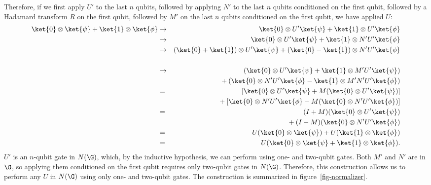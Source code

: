 Therefore, if we first apply $U'$ to the last $n$ qubits, followed by applying
$N'$ to the last $n$ qubits conditioned on the first qubit, followed by a
Hadamard transform $R$ on the first qubit, followed by $M'$ on the last $n$
qubits conditioned on the first qubit, we have applied $U$:
\begin{eqnarray}
	\ket{0} \otimes \ket{\psi} + \ket{1} \otimes \ket{\phi}
	& \rightarrow & \ket{0} \otimes U' \ket{\psi} + \ket{1} \otimes U'
	\ket{\phi} \\
	& \rightarrow & \ket{0} \otimes U' \ket{\psi} + \ket{1} \otimes N' U'
	\ket{\phi} \\
	& \rightarrow & (\ket{0} + \ket{1}) \otimes U' \ket{\psi} + (\ket{0} -
	\ket{1}) \otimes N' U' \ket{\phi} \nonumber \\ \\
	& \rightarrow & (\ket{0} \otimes U' \ket{\psi} + \ket{1} \otimes M' U'
	\ket{\psi}) \nonumber \\
	& & \mbox{} + (\ket{0} \otimes N' U' \ket{\phi} - \ket{1} \otimes M' N' U'
	\ket{\phi}) \\
	& = & \left[ \ket{0} \otimes U' \ket{\psi} + M (\ket{0} \otimes U'
	\ket{\psi}) \right] \nonumber \\
	& & \mbox{} + \left[ \ket{0} \otimes N' U' \ket{\phi} - M (\ket{0}
	\otimes N' U' \ket{\phi}) \right] \\
	& = & (I + M) (\ket{0} \otimes U' \ket{\psi}) \nonumber \\
	& & \mbox{} + (I - M) (\ket{0} \otimes N' U' \ket{\phi}) \\
	& = & U (\ket{0} \otimes \ket{\psi}) + U (\ket{1} \otimes \ket{\phi}) \\
	& = & U (\ket{0} \otimes \ket{\psi} + \ket{1} \otimes \ket{\phi}).
\end{eqnarray}
$U'$ is an $n$-qubit gate in $N(\G)$, which, by the inductive hypothesis, we
can perform using one- and two-qubit gates.  Both $M'$ and $N'$ are in $\G$, so
applying them conditioned on the first qubit requires only two-qubit gates
in $N(\G)$.  Therefore, this construction allows us to perform any $U$ in
$N(\G)$ using only one- and two-qubit gates.  The construction is summarized
in figure~\ref{fig-normalizer}.
